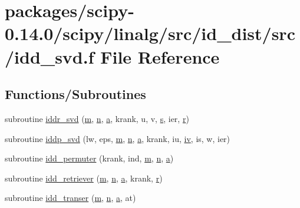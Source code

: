 \hypertarget{idd__svd_8f}{}\section{packages/scipy-\/0.14.0/scipy/linalg/src/id\+\_\+dist/src/idd\+\_\+svd.f File Reference}
\label{idd__svd_8f}
\subsection*{Functions/\+Subroutines}
\begin{DoxyCompactItemize}
\item 
subroutine \hyperlink{idd__svd_8f_aa5875c094f072b7e007524f1d7c98081}{iddr\+\_\+svd} (\hyperlink{indexexpr_8h_ab72fdb4031d47b75ab26dd18a437bcdc}{m}, \hyperlink{indexexpr_8h_ab427e2e2b4d6cec55fa088ea2a692ace}{n}, \hyperlink{gen__mat5files_8m_aae328bf20413f220e38aec4d95bfd6da}{a}, krank, u, v, \hyperlink{indexexpr_8h_ae024b0db549122b44c349ae28ec990dc}{s}, ier, \hyperlink{indexexpr_8h_ac434fd11cc2493608d8d91424d60c17e}{r})
\item 
subroutine \hyperlink{idd__svd_8f_ac484907a7f7a860e6288db591b3a2d86}{iddp\+\_\+svd} (lw, eps, \hyperlink{indexexpr_8h_ab72fdb4031d47b75ab26dd18a437bcdc}{m}, \hyperlink{indexexpr_8h_ab427e2e2b4d6cec55fa088ea2a692ace}{n}, \hyperlink{gen__mat5files_8m_aae328bf20413f220e38aec4d95bfd6da}{a}, krank, iu, \hyperlink{cephes_8h_ad4b28607832b258aa453374d01dfe8c5}{iv}, is, w, ier)
\item 
subroutine \hyperlink{idd__svd_8f_ab755513300c86457c0783755b67147c3}{idd\+\_\+permuter} (krank, ind, \hyperlink{indexexpr_8h_ab72fdb4031d47b75ab26dd18a437bcdc}{m}, \hyperlink{indexexpr_8h_ab427e2e2b4d6cec55fa088ea2a692ace}{n}, \hyperlink{gen__mat5files_8m_aae328bf20413f220e38aec4d95bfd6da}{a})
\item 
subroutine \hyperlink{idd__svd_8f_ac7203a1ea4d3b1978b25dbe98d4954b6}{idd\+\_\+retriever} (\hyperlink{indexexpr_8h_ab72fdb4031d47b75ab26dd18a437bcdc}{m}, \hyperlink{indexexpr_8h_ab427e2e2b4d6cec55fa088ea2a692ace}{n}, \hyperlink{gen__mat5files_8m_aae328bf20413f220e38aec4d95bfd6da}{a}, krank, \hyperlink{indexexpr_8h_ac434fd11cc2493608d8d91424d60c17e}{r})
\item 
subroutine \hyperlink{idd__svd_8f_a5b8ad1cc44e8dcde70d1d453e15210c4}{idd\+\_\+transer} (\hyperlink{indexexpr_8h_ab72fdb4031d47b75ab26dd18a437bcdc}{m}, \hyperlink{indexexpr_8h_ab427e2e2b4d6cec55fa088ea2a692ace}{n}, \hyperlink{gen__mat5files_8m_aae328bf20413f220e38aec4d95bfd6da}{a}, at)
\end{DoxyCompactItemize}


